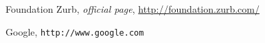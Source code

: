 \begin{thebibliography}{99999}
\singlespace\normalsize

 Foundation Zurb, \textit{ official page}, \url{http://foundation.zurb.com/}



 Google, \texttt{http://www.google.com}


\end{thebibliography}
